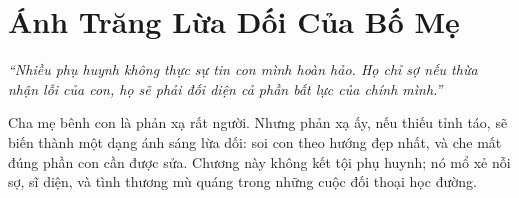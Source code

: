 \chapter{Ánh Trăng Lừa Dối Của Bố Mẹ}

\begin{center}
	\textit{\color{bookprimary}``Nhiều phụ huynh không thực sự tin con mình hoàn hảo. Họ chỉ sợ nếu thừa nhận lỗi của con, họ sẽ phải đối diện cả phần bất lực của chính mình.''}
\end{center}

\ngancach

\begin{tcolorbox}[
	colback=bookprimary!6,
	colframe=bookprimary!35,
	arc=5pt,
	title={\bfseries Ghi Chú Mở Chương},
	fonttitle=\bfseries\color{bookprimary}
]
Cha mẹ bênh con là phản xạ rất người. Nhưng phản xạ ấy, nếu thiếu tỉnh táo, sẽ biến thành một dạng ánh sáng lừa dối: soi con theo hướng đẹp nhất, và che mất đúng phần con cần được sửa. Chương này không kết tội phụ huynh; nó mổ xẻ nỗi sợ, sĩ diện, và tình thương mù quáng trong những cuộc đối thoại học đường.
\end{tcolorbox}

